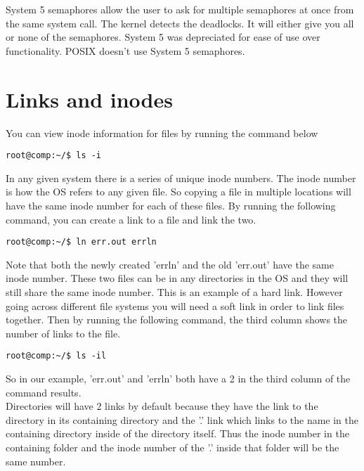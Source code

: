 \documentclass{report}
\begin{document}
System 5 semaphores allow the user to ask for multiple semaphores at once from the same system call. The kernel detects the deadlocks. It will either give you all or none of the semaphores. System 5 was depreciated for ease of use over functionality. POSIX doesn't use System 5 semaphores.\\

\section{Links and inodes}
You can view inode information for files by running the command below

\begin{verbatim}
root@comp:~/$ ls -i
\end{verbatim}

In any given system there is a series of unique inode numbers. The inode number is how the OS refers to any given file. So copying a file in multiple locations will have the same inode number for each of these files. By running the following command, you can create a link to a file and link the two.

\begin{verbatim}
root@comp:~/$ ln err.out errln
\end{verbatim}

Note that both the newly created 'errln' and the old 'err.out' have the same inode number. These two files can be in any directories in the OS and they will still share the same inode number. This is an example of a hard link. However going across different file systems you will need a soft link in order to link files together. Then by running the following command, the third column shows the number of links to the file.

\begin{verbatim}
root@comp:~/$ ls -il
\end{verbatim}

So in our example, 'err.out' and 'errln' both have a 2 in the third column of the command results.\\

Directories will have 2 links by default because they have the link to the directory in its containing directory and the '.' link which links to the name in the containing directory inside of the directory itself. Thus the inode number in the containing folder and the inode number of the '.' inside that folder will be the same number.\\
\end{document}
